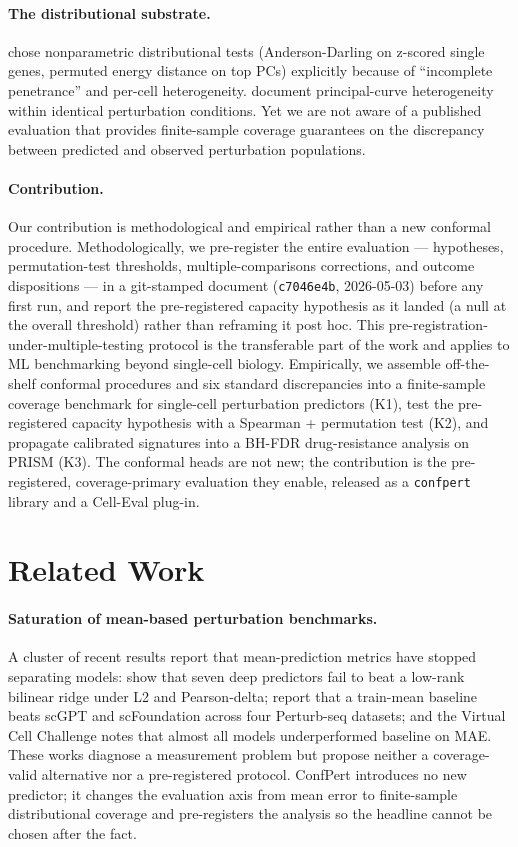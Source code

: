 \documentclass{article}
\begin{document}
\paragraph{The distributional substrate.}
\citet{replogle2022} chose nonparametric distributional tests (Anderson-Darling on z-scored single genes, permuted energy distance on top PCs) explicitly because of ``incomplete penetrance'' and per-cell heterogeneity. \citet{norman2019} document principal-curve heterogeneity within identical perturbation conditions. Yet we are not aware of a published evaluation that provides finite-sample coverage guarantees on the discrepancy between predicted and observed perturbation populations.

\paragraph{Contribution.}
Our contribution is methodological and empirical rather than a new conformal procedure. Methodologically, we pre-register the entire evaluation --- hypotheses, permutation-test thresholds, multiple-comparisons corrections, and outcome dispositions --- in a git-stamped document (\texttt{c7046e4b}, 2026-05-03) before any first run, and report the pre-registered capacity hypothesis as it landed (a null at the overall threshold) rather than reframing it post hoc. This pre-registration-under-multiple-testing protocol is the transferable part of the work and applies to ML benchmarking beyond single-cell biology. Empirically, we assemble off-the-shelf conformal procedures and six standard discrepancies into a finite-sample coverage benchmark for single-cell perturbation predictors (K1), test the pre-registered capacity hypothesis with a Spearman + permutation test (K2), and propagate calibrated signatures into a BH-FDR drug-resistance analysis on PRISM (K3). The conformal heads are not new; the contribution is the pre-registered, coverage-primary evaluation they enable, released as a \texttt{confpert} library and a Cell-Eval plug-in.

\section{Related Work}

\paragraph{Saturation of mean-based perturbation benchmarks.}
A cluster of recent results report that mean-prediction metrics have stopped separating models: \citet{ahlmann2025} show that seven deep predictors fail to beat a low-rank bilinear ridge under L2 and Pearson-delta; \citet{csendes2025} report that a train-mean baseline beats scGPT and scFoundation across four Perturb-seq datasets; and the Virtual Cell Challenge \citep{roohani2025vcc} notes that almost all models underperformed baseline on MAE. These works diagnose a measurement problem but propose neither a coverage-valid alternative nor a pre-registered protocol. ConfPert introduces no new predictor; it changes the evaluation axis from mean error to finite-sample distributional coverage and pre-registers the analysis so the headline cannot be chosen after the fact.
\end{document}
